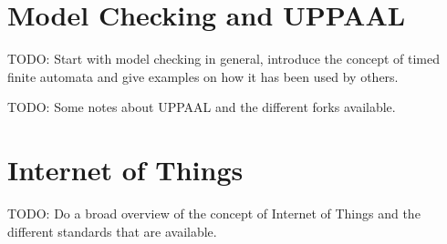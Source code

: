 \section{Model Checking and UPPAAL}
TODO: Start with model checking in general, introduce the concept of timed
finite automata and give examples on how it has been used by others.

TODO: Some notes about UPPAAL and the different forks available.

\section{Internet of Things}
TODO: Do a broad overview of the concept of Internet of Things and the
different standards that are available.
